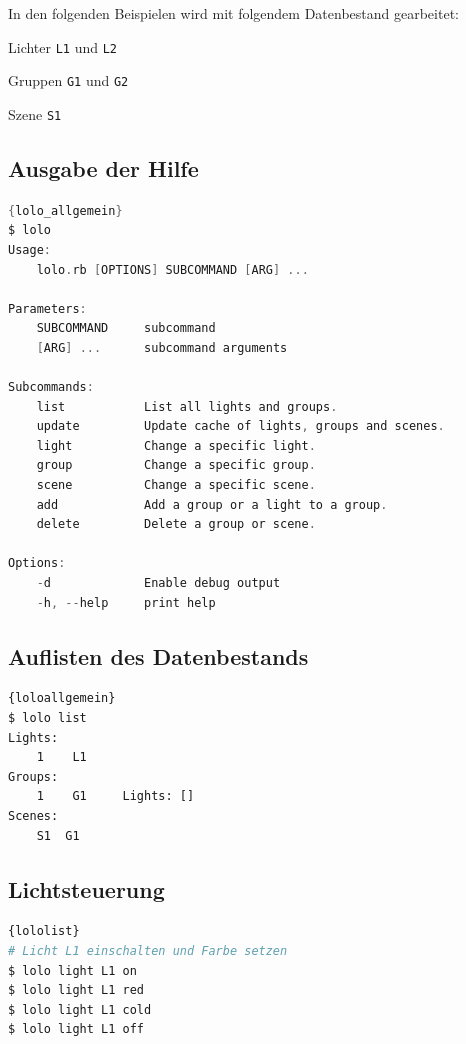 \documentclass[a4paper,12pt]{article}
\begin{document}
In den folgenden Beispielen wird mit folgendem Datenbestand gearbeitet:

\noindent
Lichter \texttt{L1} und \texttt{L2}

\noindent
Gruppen \texttt{G1} und \texttt{G2}

\noindent
Szene \texttt{S1}

\subsection{Ausgabe der Hilfe}

\begin{lstlisting}[caption=Hilfe von \texttt{lolo},
                   basicstyle=\footnotesize\ttfamily,
                   language=C]{lolo_allgemein}
$ lolo
Usage:
    lolo.rb [OPTIONS] SUBCOMMAND [ARG] ...

Parameters:
    SUBCOMMAND     subcommand
    [ARG] ...      subcommand arguments

Subcommands:
    list           List all lights and groups.
    update         Update cache of lights, groups and scenes.
    light          Change a specific light.
    group          Change a specific group.
    scene          Change a specific scene.
    add            Add a group or a light to a group.
    delete         Delete a group or scene.

Options:
    -d             Enable debug output
    -h, --help     print help
\end{lstlisting}

\newpage

\subsection{Auflisten des Datenbestands}

\begin{lstlisting}[caption={Abfrage aller Lichter, Gruppen und Szenen},
                   basicstyle=\footnotesize\ttfamily]{loloallgemein}
$ lolo list
Lights:
	1 	 L1
Groups:
	1 	 G1 	Lights: []
Scenes:
	S1 	G1
\end{lstlisting}

\subsection{Lichtsteuerung}

\begin{lstlisting}[caption=lolo Beispielaufrufe,
                   basicstyle=\footnotesize\ttfamily,language=Bash]{lololist}
# Licht L1 einschalten und Farbe setzen
$ lolo light L1 on
$ lolo light L1 red
$ lolo light L1 cold
$ lolo light L1 off

\end{lstlisting}
\end{document}
